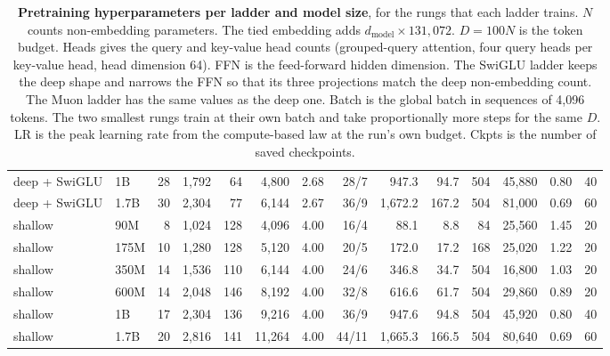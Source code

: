 \begin{table}[t]
{\begin{tabular}{llrrrrrrrrrrrr}
deep + SwiGLU & 1B & 28 & 1,792 & 64 & 4,800 & 2.68 & 28/7 & 947.3 & 94.7 & 504 & 45,880 & 0.80 & 40 \\
deep + SwiGLU & 1.7B & 30 & 2,304 & 77 & 6,144 & 2.67 & 36/9 & 1,672.2 & 167.2 & 504 & 81,000 & 0.69 & 60 \\
\midrule
shallow & 90M & 8 & 1,024 & 128 & 4,096 & 4.00 & 16/4 & 88.1 & 8.8 & 84 & 25,560 & 1.45 & 20 \\
shallow & 175M & 10 & 1,280 & 128 & 5,120 & 4.00 & 20/5 & 172.0 & 17.2 & 168 & 25,020 & 1.22 & 20 \\
shallow & 350M & 14 & 1,536 & 110 & 6,144 & 4.00 & 24/6 & 346.8 & 34.7 & 504 & 16,800 & 1.03 & 20 \\
shallow & 600M & 14 & 2,048 & 146 & 8,192 & 4.00 & 32/8 & 616.6 & 61.7 & 504 & 29,860 & 0.89 & 20 \\
shallow & 1B & 17 & 2,304 & 136 & 9,216 & 4.00 & 36/9 & 947.6 & 94.8 & 504 & 45,920 & 0.80 & 40 \\
shallow & 1.7B & 20 & 2,816 & 141 & 11,264 & 4.00 & 44/11 & 1,665.3 & 166.5 & 504 & 80,640 & 0.69 & 60 \\
\bottomrule
\end{tabular}}
\caption{\textbf{Pretraining hyperparameters per ladder and model size}, for the rungs that each ladder trains. $N$ counts non-embedding parameters. The tied embedding adds $d_{\mathrm{model}} \times 131{,}072$. $D = 100N$ is the token budget. Heads gives the query and key-value head counts (grouped-query attention, four query heads per key-value head, head dimension 64). FFN is the feed-forward hidden dimension. The SwiGLU ladder keeps the deep shape and narrows the FFN so that its three projections match the deep non-embedding count. The Muon ladder has the same values as the deep one. Batch is the global batch in sequences of 4,096 tokens. The two smallest rungs train at their own batch and take proportionally more steps for the same $D$. LR is the peak learning rate from the compute-based law at the run's own budget. Ckpts is the number of saved checkpoints.}
\label{tab:ladder}
\end{table}

